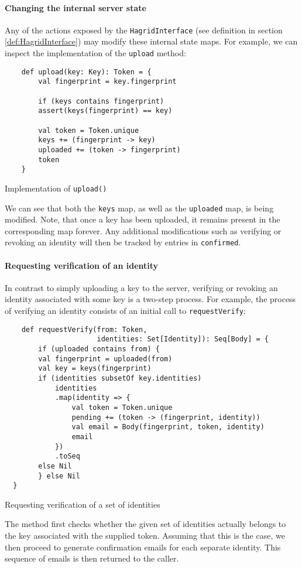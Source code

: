 \paragraph{Changing the internal server state}
Any of the actions exposed by the \texttt{HagridInterface} (see definition in section \ref{def:HagridInterface}) may modify these internal state maps.
For example, we can inspect the implementation of the \texttt{upload} method:
\begin{code}
    \begin{verbatim}
    def upload(key: Key): Token = {
        val fingerprint = key.fingerprint

        if (keys contains fingerprint)
        assert(keys(fingerprint) == key)

        val token = Token.unique
        keys += (fingerprint -> key)
        uploaded += (token -> fingerprint)
        token
    }
    \end{verbatim}
    \caption{Implementation of \texttt{upload()}}
\end{code}

We can see that both the \texttt{keys} map, as well as the \texttt{uploaded} map, is being modified. Note, that once a key has been uploaded, it remains present in the corresponding map forever. Any additional modifications such as verifying or revoking an identity will then be tracked by entries in \texttt{confirmed}.

\paragraph{Requesting verification of an identity} In contrast to simply uploading a key to the server, verifying or revoking an identity associated with some key is a two-step process.
For example, the process of verifying an identity consists of an initial call to \texttt{requestVerify}:
\begin{code}
    \begin{verbatim}
    def requestVerify(from: Token, 
                      identities: Set[Identity]): Seq[Body] = {
        if (uploaded contains from) {
        val fingerprint = uploaded(from)
        val key = keys(fingerprint)
        if (identities subsetOf key.identities)
            identities
            .map(identity => {
                val token = Token.unique
                pending += (token -> (fingerprint, identity))
                val email = Body(fingerprint, token, identity)
                email
            })
            .toSeq
        else Nil
        } else Nil
  }
    \end{verbatim}
    \caption{Requesting verification of a set of identities}
\end{code}
The method first checks whether the given set of identities actually belongs to the key associated with the supplied token. Assuming that this is the case, we then proceed to generate confirmation emails for each separate identity. This sequence of emails is then returned to the caller.

